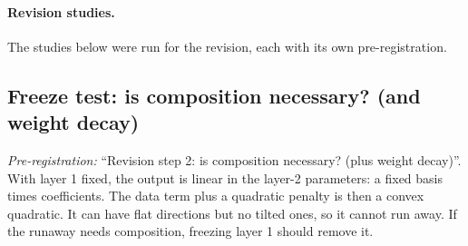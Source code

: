 \paragraph{Revision studies.} The studies below were run for the revision, each with its own pre-registration.

\subsection{Freeze test: is composition necessary? (and weight decay)}
\noindent\textit{Pre-registration:} ``Revision step 2: is composition necessary? (plus weight decay)''. With layer 1 fixed, the output is linear in the layer-2 parameters: a fixed basis times coefficients. The data term plus a quadratic penalty is then a convex quadratic. It can have flat directions but no tilted ones, so it cannot run away. If the runaway needs composition, freezing layer 1 should remove it.

